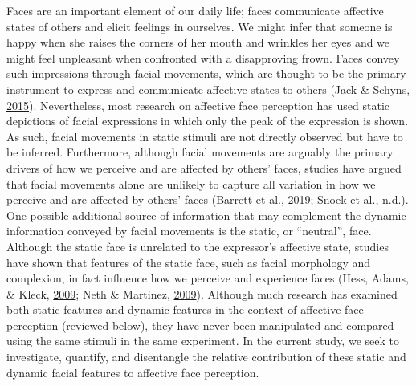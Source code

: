 \documentclass[12pt,american,a4paper,oneside,]{memoir} %
\begin{document}
Faces are an important element of our daily life; faces communicate affective states of others and elicit feelings in ourselves. We might infer that someone is happy when she raises the corners of her mouth and wrinkles her eyes and we might feel unpleasant when confronted with a disapproving frown. Faces convey such impressions through facial movements, which are thought to be the primary instrument to express and communicate affective states to others (Jack \& Schyns, \protect\hyperlink{ref-Jack2015-sh}{2015}). Nevertheless, most research on affective face perception has used static depictions of facial expressions in which only the peak of the expression is shown. As such, facial movements in static stimuli are not directly observed but have to be inferred. Furthermore, although facial movements are arguably the primary drivers of how we perceive and are affected by others' faces, studies have argued that facial movements alone are unlikely to capture all variation in how we perceive and are affected by others' faces (Barrett et al., \protect\hyperlink{ref-Barrett2019-bc}{2019}; Snoek et al., \protect\hyperlink{ref-snoek-submitted}{n.d.}). One possible additional source of information that may complement the dynamic information conveyed by facial movements is the static, or ``neutral'', face. Although the static face is unrelated to the expressor's affective state, studies have shown that features of the static face, such as facial morphology and complexion, in fact influence how we perceive and experience faces (Hess, Adams, \& Kleck, \protect\hyperlink{ref-Hess2009-xo}{2009}; Neth \& Martinez, \protect\hyperlink{ref-Neth2009-eh}{2009}). Although much research has examined both static features and dynamic features in the context of affective face perception (reviewed below), they have never been manipulated and compared using the same stimuli in the same experiment. In the current study, we seek to investigate, quantify, and disentangle the relative contribution of these static and dynamic facial features to affective face perception.
\end{document}
